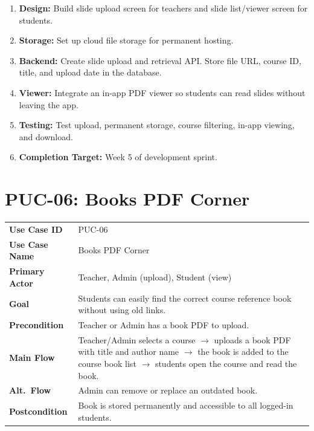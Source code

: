 \documentclass[12pt,a4paper]{article}
\begin{document}
\begin{tcolorbox}[planbox, title={Completion Plan --- PUC-05}]
\begin{enumerate}[leftmargin=*, label=\textbf{Step \arabic*:}, itemsep=4pt]
  \item \textbf{Design:} Build slide upload screen for teachers and slide list/viewer screen for students.
  \item \textbf{Storage:} Set up cloud file storage for permanent hosting.
  \item \textbf{Backend:} Create slide upload and retrieval API. Store file URL, course ID, title, and upload date in the database.
  \item \textbf{Viewer:} Integrate an in-app PDF viewer so students can read slides without leaving the app.
  \item \textbf{Testing:} Test upload, permanent storage, course filtering, in-app viewing, and download.
  \item \textbf{Completion Target:} Week 5 of development sprint.
\end{enumerate}
\end{tcolorbox}

\newpage
\section{PUC-06: Books PDF Corner}

\begin{tcolorbox}[pucbox, title={Product Use Case --- PUC-06}]
\begin{tabularx}{\linewidth}{p{3.5cm} X}
\textbf{Use Case ID}    & PUC-06 \\
\textbf{Use Case Name}  & Books PDF Corner \\
\textbf{Primary Actor}  & Teacher, Admin (upload), Student (view) \\
\textbf{Goal}           & Students can easily find the correct course reference book without using old links. \\
\textbf{Precondition}   & Teacher or Admin has a book PDF to upload. \\
\textbf{Main Flow}      & Teacher/Admin selects a course $\rightarrow$ uploads a book PDF with title and author name $\rightarrow$ the book is added to the course book list $\rightarrow$ students open the course and read the book. \\
\textbf{Alt.\ Flow}     & Admin can remove or replace an outdated book. \\
\textbf{Postcondition}  & Book is stored permanently and accessible to all logged-in students. \\
\end{tabularx}
\end{tcolorbox}
\end{document}
